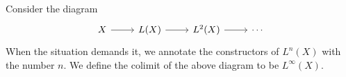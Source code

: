 \begin{comment}
\begin{defn}
For any type $X$, we define the \emph{one-step localization of $X$ at $F$} as
the higher inductive type $L(X)$ with constructors
\begin{align*}
l & : X\to L(X) \\
i,j & : (P(a)\to X) \to (Q(a)\to L(X)) \\
p & : \prd{g:Q(a)\to X}{q:Q(a)} \id{i(g\circ F(a),q)}{l(g(q))} \\
q & : \prd{f:P(a)\to X}{p:P(a)} \id{j(f,F(a,p))}{l(f(p))}
\end{align*} 
\end{defn}

\begin{lem}
Let $X$ be a type and consider the short sequence
\begin{equation*}
\begin{tikzcd}
X \arrow[r] & L(X) \arrow[r] & L^2(X).
\end{tikzcd}
\end{equation*}
There is a term of type
\begin{equation*}
\prd{f:P(a)\to X}{q:Q(a)} \id[L^2(X)]{l(k(f,q))}{k(l\circ f,q)}
\end{equation*}
for both $k\jdeq i$ and $k\jdeq j$.
\end{lem}

\begin{proof}
We first prove the assertion for $k\jdeq i$. Let $f:P(a)\to X$ and $q:Q(a)$.
Then we have to find an identification $l(i(f,q)) = i(l\circ f,q)$.
\begin{align*}
l\circ i(f) & = i(i(f)\circ F(a)) \\
& = \cdots \\
& = l\circ j(f) \\
& = i(j(f)\circ F(a))\\
& = i( l\circ f)
\end{align*}
\end{proof}
\end{comment}

\begin{defn}
Consider the diagram
\begin{equation*}
\begin{tikzcd}
X \arrow[r] & L(X) \arrow[r] & L^2(X) \arrow[r] & \cdots
\end{tikzcd}
\end{equation*}
When the situation demands it, we annotate the constructors of $L^n(X)$ with
the number $n$. We define the colimit of the above diagram to be $L^\infty(X)$. 
\end{defn}

